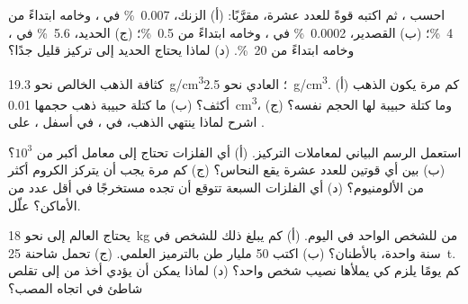 \begin{exercise}[$\star\star$]\label{exo:g9:earth-resources:5}
احسب ، ثم اكتبه قوةً للعدد عشرة، مقرَّبًا: (أ) الزنك،
\qty{0.007}{\%} في ، وخامه ابتداءً من \qty{4}{\%}؛ (ب) القصدير،
\qty{0.0002}{\%} في ، وخامه ابتداءً من \qty{0.5}{\%}؛ (ج) الحديد،
\qty{5.6}{\%} في ، وخامه ابتداءً من \qty{20}{\%}. (د) لماذا يحتاج
الحديد إلى تركيز قليل جدًا؟
\end{exercise}

\begin{exercise}[$\star\star$]\label{exo:g9:earth-resources:6}
كثافة الذهب الخالص نحو \qty{19.3}{g/cm^3}؛  العادي نحو
\qty{2.5}{g/cm^3}. (أ) كم مرة يكون الذهب أكثف؟ (ب) ما كتلة حبيبة ذهب
حجمها \qty{0.01}{cm^3}، وما كتلة حبيبة  لها الحجم نفسه؟ (ج) اشرح
لماذا ينتهي الذهب، في ، في أسفل ، على .
\end{exercise}

\begin{exercise}[$\star\star$]\label{exo:g9:earth-resources:7}
استعمل الرسم البياني لمعاملات التركيز. (أ) أي الفلزات تحتاج إلى معامل
أكبر من $10^3$؟ (ب) بين أي قوتين للعدد عشرة يقع النحاس؟ (ج) كم
مرة يجب أن يتركز الكروم أكثر من الألومنيوم؟ (د) أي الفلزات السبعة
تتوقع أن تجده مستخرجًا في أقل عدد من الأماكن؟
علّل.
\end{exercise}

\begin{exercise}[$\star\star$]\label{exo:g9:earth-resources:8}
يحتاج العالم إلى نحو \qty{18}{kg} من   للشخص الواحد في
اليوم. (أ) كم يبلغ ذلك للشخص في سنة واحدة، بالأطنان؟ (ب) اكتب 50 مليار
طن بالترميز العلمي. (ج) تحمل شاحنة \qty{25}{t}. كم يومًا يلزم كي
يملأها نصيب شخص واحد؟ (د) لماذا يمكن أن يؤدي أخذ  من  إلى
تقلص شاطئ في اتجاه المصب؟
\end{exercise}

